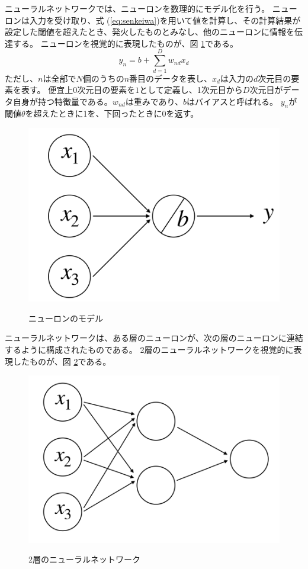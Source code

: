 \documentclass[titlepage,12pt]{jreport}
\begin{document}
ニューラルネットワークでは、ニューロンを数理的にモデル化を行う。 ニューロンは入力を受け取り、式 (\ref{eq:senkeiwa})を用いて値を計算し、その計算結果が設定した閾値を超えたとき、発火したものとみなし、他のニューロンに情報を伝達する。 ニューロンを視覚的に表現したものが、図 \ref{fig:single-perceptron}である。
\begin{equation}
	y_n = b + \sum_{d = 1}^{D} w_{nd}x_d
	\label{eq:senkeiwa}
\end{equation}
ただし、$n$は全部で$N$個のうちの$n$番目のデータを表し、$x_d$は入力の$d$次元目の要素を表す。 便宜上$0$次元目の要素を$1$として定義し、1次元目から$D$次元目がデータ自身が持つ特徴量である。$w_{nd}$は重みであり、$b$はバイアスと呼ばれる。 $y_n$が閾値$\theta$を超えたときに1を、下回ったときに0を返す。 
\begin{figure}[tbp]
	\begin{center}
		\caption{ニューロンのモデル}
		\includegraphics[width = 120mm]{img/single-perceptron.png}
		\label{fig:single-perceptron}
	\end{center}
\end{figure}

ニューラルネットワークは、ある層のニューロンが、次の層のニューロンに連結するように構成されたものである。 2層のニューラルネットワークを視覚的に表現したものが、図 \ref{fig:multi-perceptron}である。
\begin{figure}[tbp]
	\begin{center}
		\caption{2層のニューラルネットワーク}
		\includegraphics[width = 120mm]{img/multi-perceptron.png}
		\label{fig:multi-perceptron}
	\end{center}
\end{figure}
\end{document}
